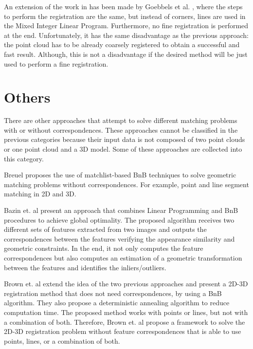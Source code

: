         An extension of the work in \cite{Goebbels_2018_alinear} has been made by Goebbels et al. \cite{Goebbels_2018_linebased}, 
        where the steps to perform the registration are the same, but instead of corners, lines are used in the Mixed Integer Linear Program. 
        Furthermore, no fine registration is performed at the end.
        Unfortunately, it has the same disadvantage as the previous approach: the point cloud has to be already coarsely registered to obtain a successful and fast result.
        Although, this is not a disadvantage if the desired method will be just used to perform a fine registration.

    \section{Others}
    There are other approaches that attempt to solve different matching problems with or without correspondences.
    These approaches cannot be classified in the previous categories because their input data is not composed of two point clouds or one point cloud and a 3D model.
    Some of these approaches are collected into this category.

    Breuel \cite{Breuel_2003_implementation} proposes the use of matchlist-based BnB techniques to solve geometric matching problems without correspondences.
    For example, point and line segment matching in 2D and 3D.

    Bazin et. al \cite{Bazin_2013_abranchandbound} present an approach that combines Linear Programming and BnB procedures to achieve global optimality.
    The proposed algorithm receives two different sets of features extracted from two images and outputs
    the correspondences between the features verifying the appearance similarity and geometric constraints.
    In the end, it not only computes the feature correspondences but also computes an estimation of a geometric transformation between the features
    and identifies the inliers/outliers.

    Brown et. al \cite{Brown_2015_globally} extend the idea of the two previous approaches and present a 2D-3D registration method that does not need
    correspondences, by using a BnB algorithm. They also propose a deterministic annealing algorithm to reduce computation time.
    The proposed method works with points or lines, but not with a combination of both.
    Therefore, Brown et. al \cite{Brown_2019_afamily} propose a framework to solve the 2D-3D registration problem without feature correspondences
    that is able to use points, lines, or a combination of both.

